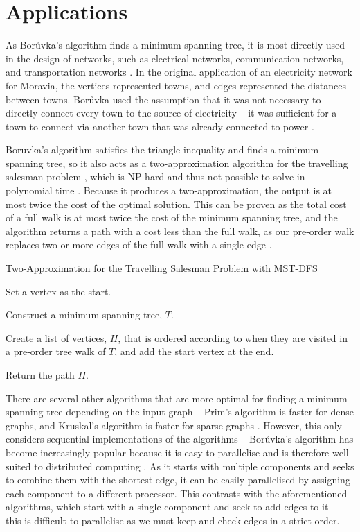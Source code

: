 \documentclass[a4paper, 11pt]{article}
\begin{document}
\section{Applications}
As Borůvka's algorithm finds a minimum spanning tree, it is most directly used in the design of networks, such as electrical networks, communication networks, and transportation networks \cite{graham1985history}. In the original application of an electricity network for Moravia, the vertices represented towns, and edges represented the distances between towns. Borůvka used the assumption that it was not necessary to directly connect every town to the source of electricity -- it was sufficient for a town to connect via another town that was already connected to power \cite{nevsetvril2001otakar}.

Boruvka's algorithm satisfies the triangle inequality and finds a minimum spanning tree, so it also acts as a two-approximation algorithm for the travelling salesman problem \cite{andreae1995performance}, which is NP-hard and thus not possible to solve in polynomial time \cite{junger1995traveling}. Because it produces a two-approximation, the output is at most twice the cost of the optimal solution. This can be proven as the total cost of a full walk is at most twice the cost of the minimum spanning tree, and the algorithm returns a path with a cost less than the full walk, as our pre-order walk replaces two or more edges of the full walk with a single edge \cite{andreae1995performance}.

\begin{algorithm}
    \caption{Two-Approximation for the Travelling Salesman Problem with MST-DFS \cite{andreae1995performance}}
    \nl Set a vertex as the start.
    
    \nl Construct a minimum spanning tree, $T$.
    
    \nl Create a list of vertices, $H$, that is ordered according to when they are visited in a pre-order tree walk of $T$, and add the start vertex at the end.
    
    \nl Return the path $H$.
\end{algorithm}

There are several other algorithms that are more optimal for finding a minimum spanning tree depending on the input graph -- Prim's algorithm is faster for dense graphs, and Kruskal's algorithm is faster for sparse graphs \cite{bazlamaccci2001minimum}. However, this only considers sequential implementations of the algorithms -- Borůvka's algorithm has become increasingly popular because it is easy to parallelise and is therefore well-suited to distributed computing \cite{mariano2015generic}. As it starts with multiple components and seeks to combine them with the shortest edge, it can be easily parallelised by assigning each component to a different processor. This contrasts with the aforementioned algorithms, which start with a single component and seek to add edges to it -- this is difficult to parallelise as we must keep and check edges in a strict order.
\end{document}
